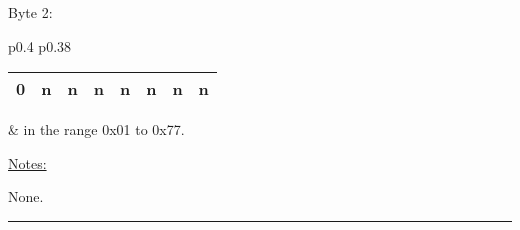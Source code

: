 Byte 2:

\begin{tabular}{p{0.4\linewidth} p{0.38\linewidth}} 

\begin{tabular}{|p{0.3cm}|p{0.3cm}|p{0.3cm}|p{0.3cm}|p{0.3cm}|p{0.3cm}|p{0.3cm}|p{0.3cm}|}
\hline
0 & n & n & n & n & n & n & n\\
\hline
\end{tabular}
& in the range 0x01 to 0x77.\\
\end{tabular}

\underline{Notes:} 

None.

\rule{15.1cm}{0.4pt}
